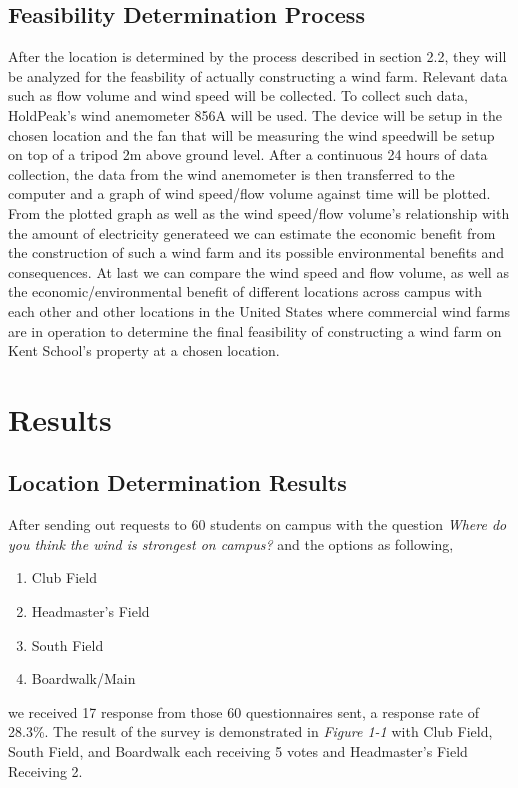 \documentclass[review]{elsarticle}
\begin{document}
\subsection{Feasibility Determination Process}
After the location is determined by the process described in section 2.2, they will be analyzed for the feasbility of actually constructing a wind farm. Relevant data 
such as flow volume and wind speed will be collected. To collect such data, HoldPeak's wind anemometer 856A will be used. The device will be setup in the chosen location 
and the fan that will be measuring the wind speedwill be setup on top of a tripod 2m above ground level. After a continuous 24 hours of data collection, the data from the 
wind anemometer is then transferred to the computer and a graph of wind speed/flow volume against time will be plotted.
\\\indent From the plotted graph as well as the wind speed/flow volume's relationship with the amount of electricity generateed we can estimate the economic benefit from 
the construction of such a wind farm and its possible environmental benefits and consequences. At last we can compare the wind speed and flow volume, as well as the 
economic/environmental benefit of different locations across campus with each other and other locations in the United States where commercial wind farms are in operation 
to determine the final feasibility of constructing a wind farm on Kent School's property at a chosen location.

\section{Results}
\subsection{Location Determination Results}
After sending out requests to 60 students on campus with the question \textit{Where do you think the wind is strongest on campus?} and the options as following,
\begin{enumerate}
    \item {Club Field}
    \item {Headmaster's Field}
    \item {South Field}
    \item {Boardwalk/Main}   
\end{enumerate}
we received 17 response from those 60 questionnaires sent, a response rate of 28.3\%. The result of the survey is demonstrated in \textit{Figure 1-1} with Club Field, South Field, and Boardwalk each receiving 5 votes and Headmaster's Field Receiving 2. 
\end{document}
